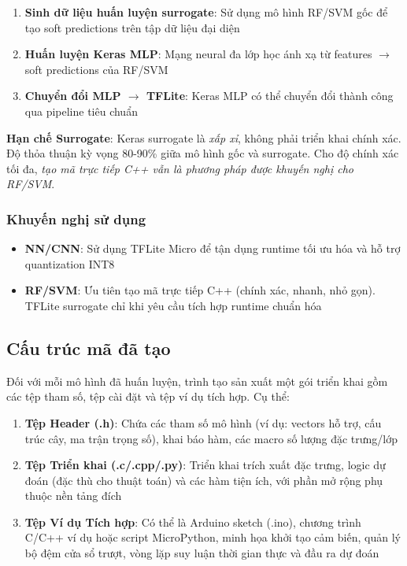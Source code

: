 \begin{enumerate}
    \item \textbf{Sinh dữ liệu huấn luyện surrogate}: Sử dụng mô hình RF/SVM gốc để tạo soft predictions trên tập dữ liệu đại diện
    \item \textbf{Huấn luyện Keras MLP}: Mạng neural đa lớp học ánh xạ từ features $\rightarrow$ soft predictions của RF/SVM
    \item \textbf{Chuyển đổi MLP $\rightarrow$ TFLite}: Keras MLP có thể chuyển đổi thành công qua pipeline tiêu chuẩn
\end{enumerate}

\textbf{Hạn chế Surrogate}: Keras surrogate là \textit{xấp xỉ}, không phải triển khai chính xác. Độ thỏa thuận kỳ vọng 80-90\% giữa mô hình gốc và surrogate. Cho độ chính xác tối đa, \textit{tạo mã trực tiếp C++ vẫn là phương pháp được khuyến nghị cho RF/SVM}.

\subsubsection{Khuyến nghị sử dụng}
\begin{itemize}
    \item \textbf{NN/CNN}: Sử dụng TFLite Micro để tận dụng runtime tối ưu hóa và hỗ trợ quantization INT8
    \item \textbf{RF/SVM}: Ưu tiên tạo mã trực tiếp C++ (chính xác, nhanh, nhỏ gọn). TFLite surrogate chỉ khi yêu cầu tích hợp runtime chuẩn hóa
\end{itemize}

\subsection{Cấu trúc mã đã tạo}
Đối với mỗi mô hình đã huấn luyện, trình tạo sản xuất một gói triển khai gồm các tệp tham số, tệp cài đặt và tệp ví dụ tích hợp. Cụ thể:
\begin{enumerate}
    \item \textbf{Tệp Header (.h)}: Chứa các tham số mô hình (ví dụ: vectors hỗ trợ, cấu trúc cây, ma trận trọng số), khai báo hàm, các macro số lượng đặc trưng/lớp
    \item \textbf{Tệp Triển khai (.c/.cpp/.py)}: Triển khai trích xuất đặc trưng, logic dự đoán (đặc thù cho thuật toán) và các hàm tiện ích, với phần mở rộng phụ thuộc nền tảng đích
    \item \textbf{Tệp Ví dụ Tích hợp}: Có thể là Arduino sketch (.ino), chương trình C/C++ ví dụ hoặc script MicroPython, minh họa khởi tạo cảm biến, quản lý bộ đệm cửa sổ trượt, vòng lặp suy luận thời gian thực và đầu ra dự đoán
\end{enumerate}

